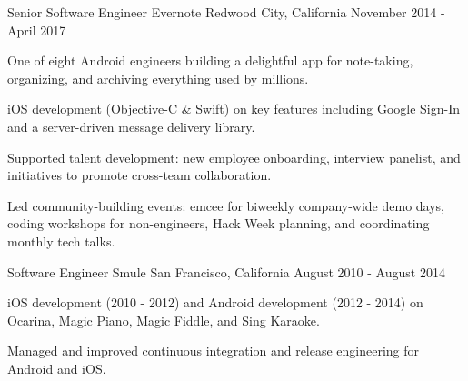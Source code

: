 \begin{cventries}
  \cventry
    {Senior Software Engineer} %
    {Evernote} %
    {Redwood City, California} %
    {November 2014 - April 2017} %
    {
	\begin{cvitems} %
      	\item {One of eight Android engineers building a delightful app for note-taking, organizing, and archiving everything used by millions.}
	\item {iOS development (Objective-C \& Swift) on key features including Google Sign-In and a server-driven message delivery library.}
	\item {Supported talent development: new employee onboarding, interview panelist, and initiatives to promote cross-team collaboration.}
	\item {Led community-building events: emcee for biweekly company-wide demo days, coding workshops for non-engineers, Hack Week planning, and coordinating monthly tech talks.}
	\end{cvitems}
    }
    
  \cventry
    {Software Engineer} %
    {Smule} %
    {San Francisco, California} %
    {August 2010 - August 2014} %
    {
      \begin{cvitems} %
       \item {iOS development (2010 - 2012) and Android development (2012 - 2014) on Ocarina, Magic Piano, Magic Fiddle, and Sing Karaoke.}
        \item {Managed and improved continuous integration and release engineering for Android and iOS.}
      \end{cvitems}
    }
    

\end{cventries}
